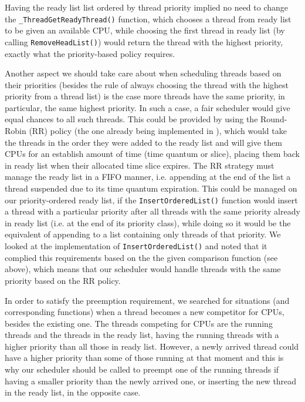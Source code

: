 Having the ready list list ordered by thread priority implied no need to change the \lstinline|_ThreadGetReadyThread()| function, which chooses a thread from ready list to be given an available CPU, while choosing the first thread in ready list (by calling \lstinline|RemoveHeadList()|) would return the thread with the highest priority, exactly what the priority-based policy requires. 

Another aspect we should take care about when scheduling threads based on their priorities (besides the rule of always choosing the thread with the highest priority from a thread list) is the case more threads have the same priority, in particular, the same highest priority. In such a case, a fair scheduler would give equal chances to all such threads. This could be provided by using the Round-Robin (RR) policy (the one already being implemented in \OSName{}), which would take the threads in the order they were added to the ready list and will give them CPUs for an establish amount of time (time quantum or slice), placing them back in ready list when their allocated time slice expires. The RR strategy must manage the ready list in a FIFO manner, i.e. appending at the end of the list a thread suspended due to its time quantum expiration. This could be managed on our priority-ordered ready list, if the \lstinline|InsertOrderedList()| function would insert a thread with a particular priority after all threads with the same priority already in ready list (i.e. at the end of its priority class), while doing so it would be the equivalent of appending to a list containing only threads of that priority. We looked at the implementation of \lstinline|InsertOrderedList()| and noted that it complied this requirements based on the the given comparison function (see above), which means that our scheduler would handle threads with the same priority based on the RR policy. 

In order to satisfy the preemption requirement, we searched for situations (and corresponding functions) when a thread becomes a new competitor for CPUs, besides the existing one. The threads competing for CPUs are the running threads and the threads in the ready list, having the running threads with a higher priority than all those in ready list. However, a newly arrived thread could have a higher priority than some of those running at that moment and this is why our scheduler should be called to preempt one of the running threads if having a smaller priority than the newly arrived one, or inserting the new thread in the ready list, in the opposite case. 


